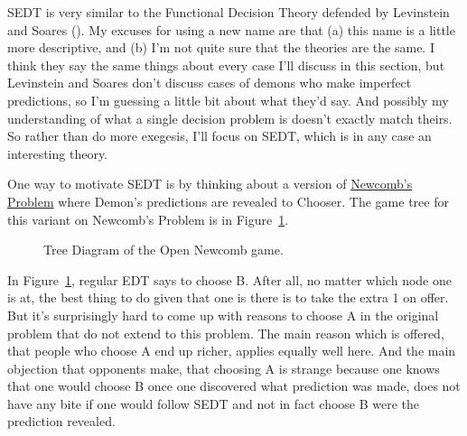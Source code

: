 \documentclass[
  12pt,
  letterpaper,
  DIV=11,
  numbers=noendperiod]{scrreprt}
\begin{document}
SEDT is very similar to the Functional Decision Theory defended by
Levinstein and Soares (). My
excuses for using a new name are that (a) this name is a little more
descriptive, and (b) I'm not quite sure that the theories are the same.
I think they say the same things about every case I'll discuss in this
section, but Levinstein and Soares don't discuss cases of demons who
make imperfect predictions, so I'm guessing a little bit about what
they'd say. And possibly my understanding of what a single decision
problem is doesn't exactly match theirs. So rather than do more
exegesis, I'll focus on SEDT, which is in any case an interesting
theory.

One way to motivate SEDT is by thinking about a version of
\hyperref[tbl-newcomb]{Newcomb's Problem} where Demon's predictions are
revealed to Chooser. The game tree for this variant on Newcomb's Problem
is in Figure~\ref{fig-open-newcomb}.

\begin{figure}


\caption{\label{fig-open-newcomb}Tree Diagram of the Open Newcomb game.}

\end{figure}%

In Figure~\ref{fig-open-newcomb}, regular EDT says to choose B. After
all, no matter which node one is at, the best thing to do given that one
is there is to take the extra 1 on offer. But it's surprisingly hard to
come up with reasons to choose A in the original problem that do not
extend to this problem. The main reason which is offered, that people
who choose A end up richer, applies equally well here. And the main
objection that opponents make, that choosing A is strange because one
knows that one would choose B once one discovered what prediction was
made, does not have any bite if one would follow SEDT and not in fact
choose B were the prediction revealed.
\end{document}
